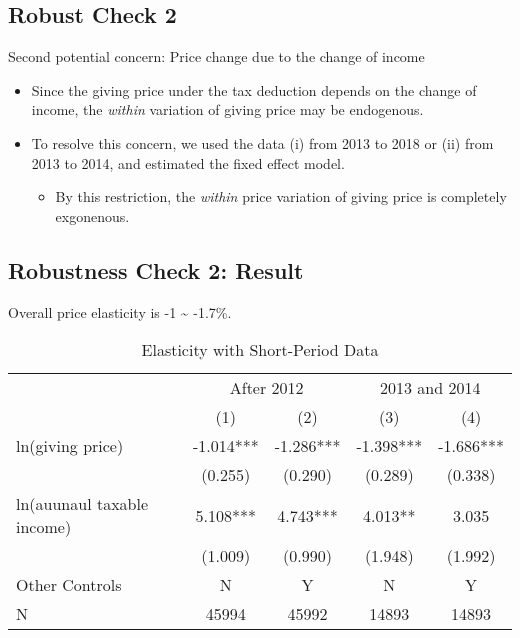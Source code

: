 \documentclass[ review  , 3p ]{elsarticle}
\providecommand{\tightlist}{%
  \setlength{\itemsep}{0pt}\setlength{\parskip}{0pt}}
\begin{document}
  \hypertarget{robust-check-2}{%
  \subsection{Robust Check 2}\label{robust-check-2}}

  Second potential concern: Price change due to the change of income

  \begin{itemize}
  \tightlist
  \item
    Since the giving price under the tax deduction depends on the change of income, the \emph{within} variation of giving price may be endogenous.
  \item
    To resolve this concern, we used the data (i) from 2013 to 2018 or (ii) from 2013 to 2014, and estimated the fixed effect model.

    \begin{itemize}
    \tightlist
    \item
      By this restriction, the \emph{within} price variation of giving price is completely exgonenous.
    \end{itemize}
  \end{itemize}

  \hypertarget{robustness-check-2-result}{%
  \subsection{Robustness Check 2: Result}\label{robustness-check-2-result}}

  Overall price elasticity is -1 \textasciitilde{} -1.7\%.

  \begin{table}

  \caption{\label{tab:kableShortElasticity1}Elasticity with Short-Period Data}
  \centering
  \fontsize{8}{10}\selectfont
  \begin{tabular}[t]{lcccc}
  \toprule
  \multicolumn{1}{c}{ } & \multicolumn{2}{c}{After 2012} & \multicolumn{2}{c}{2013 and 2014} \\
  \cmidrule(l{3pt}r{3pt}){2-3} \cmidrule(l{3pt}r{3pt}){4-5}
   & (1) & (2) & (3) & (4)\\
  \midrule
  ln(giving price) & -1.014*** & -1.286*** & -1.398*** & -1.686***\\
   & (0.255) & (0.290) & (0.289) & (0.338)\\
  ln(auunaul taxable income) & 5.108*** & 4.743*** & 4.013** & 3.035\\
   & (1.009) & (0.990) & (1.948) & (1.992)\\
  Other Controls & N & Y & N & Y\\
  N & 45994 & 45992 & 14893 & 14893\\
  \bottomrule
  \end{tabular}
  \end{table}
\end{document}
